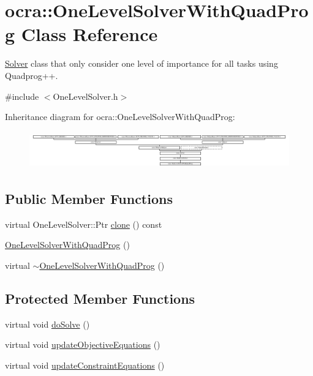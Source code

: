 \hypertarget{classocra_1_1OneLevelSolverWithQuadProg}{}\section{ocra\+:\+:One\+Level\+Solver\+With\+Quad\+Prog Class Reference}
\label{classocra_1_1OneLevelSolverWithQuadProg}


\hyperlink{classocra_1_1Solver}{Solver} class that only consider one level of importance for all tasks using Quadprog++.  




{\ttfamily \#include $<$One\+Level\+Solver.\+h$>$}

Inheritance diagram for ocra\+:\+:One\+Level\+Solver\+With\+Quad\+Prog\+:\begin{figure}[H]
\begin{center}
\leavevmode
\includegraphics[height=1.623188cm]{d9/d45/classocra_1_1OneLevelSolverWithQuadProg}
\end{center}
\end{figure}
\subsection*{Public Member Functions}
\begin{DoxyCompactItemize}
\item 
virtual One\+Level\+Solver\+::\+Ptr \hyperlink{classocra_1_1OneLevelSolverWithQuadProg_a706e7772885ae7ab3e78565d51286eac}{clone} () const
\item 
\hyperlink{classocra_1_1OneLevelSolverWithQuadProg_a0d7f639dd36c79056c264f0c09d5be50}{One\+Level\+Solver\+With\+Quad\+Prog} ()
\item 
virtual \hyperlink{classocra_1_1OneLevelSolverWithQuadProg_a27d12b82fcaec15ca7041064bd7f9095}{$\sim$\+One\+Level\+Solver\+With\+Quad\+Prog} ()
\end{DoxyCompactItemize}
\subsection*{Protected Member Functions}
\begin{DoxyCompactItemize}
\item 
virtual void \hyperlink{classocra_1_1OneLevelSolverWithQuadProg_aa6e7517459ef68106e83a7f0dc09c977}{do\+Solve} ()
\item 
virtual void \hyperlink{classocra_1_1OneLevelSolverWithQuadProg_a3c36b4620ee75c8f6c104244350087c2}{update\+Objective\+Equations} ()
\item 
virtual void \hyperlink{classocra_1_1OneLevelSolverWithQuadProg_a0276b1005f8b5812b313aa594d01118a}{update\+Constraint\+Equations} ()
\end{DoxyCompactItemize}
